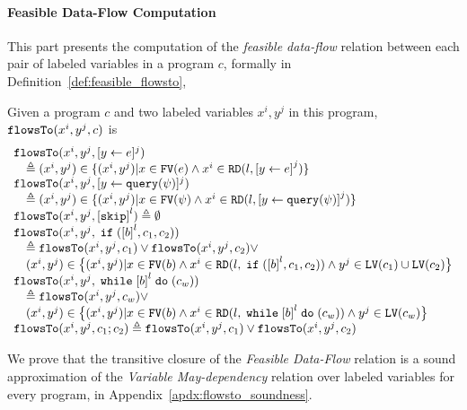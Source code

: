 \paragraph{Feasible Data-Flow Computation}
This part presents the computation of the \emph{feasible data-flow} relation between each pair of labeled variables in a program $c$,
formally in Definition~\ref{def:feasible_flowsto}, 
%
%
\begin{defn}
 \label{def:feasible_flowsto}
 Given a program $c$ and two labeled variables $x^i, y^j$ in this program, 
 $\mathtt{flowsTo}(x^i, y^j, c)$ is 
 \[
 \begin{array}{l}
 \flowsto(x^i, y^j, \clabel{\assign{y}{\expr}}{}^j) 
 \\ \quad \triangleq (x^i, y^j) \in \{ (x^i, y^j) | x \in \kw{FV}(\expr) 
 \land x^i \in \live(l, \clabel{\assign{y}{\expr}}^j) \} \\
 \flowsto(x^i, y^j, \clabel{\assign{y}{\query(\qexpr)}}{}^j) 
 \\ \quad \triangleq (x^i, y^j) \in \{ (x^i, y^j) | x \in \kw{FV}(\qexpr) 
 \land x^i \in \live(l,\clabel{\assign{y}{\query(\qexpr)}}^j) \} \\
 \flowsto(x^i, y^j, \clabel{\eskip}^{l}) 
 \triangleq \emptyset \\
 \flowsto(x^i, y^j, \eif (\clabel{\bexpr}^{l}, c_1, c_2)) 
 \\ \quad \triangleq \flowsto(x^i, y^j, c_1) \lor \flowsto(x^i, y^j, c_2) \lor
 \\ \quad (x^i, y^j) \in \big\{(x^i,y^j) | x \in \kw{FV}(b)  \land
 x^i \in \live(l, \eif (\clabel{\bexpr}^{l}, c_1, c_2)) \land y^j \in \lvar(c_1)\cup \lvar(c_2) \big\}
 \\
 \flowsto(x^i, y^j, \ewhile \clabel{\bexpr}^{l} \edo (c_w)) 
 \\ \quad \triangleq \flowsto(x^i, y^j, c_w) \lor
 \\ \quad
 (x^i, y^j) \in \big\{(x^i,y^j) | x \in \kw{FV}(b) 
 \land x^i \in \live(l, \ewhile \clabel{\bexpr}^{l} \edo (c_w)) \land y^j \in \lvar(c_w) \big\} 
 \\
 \flowsto(x^i, y^j, c_1 ;c_2) 
 \triangleq \flowsto(x^i, y^j, c_1) \lor \flowsto(x^i, y^j, c_2) \\
 \end{array}
 \]
 \end{defn}
%
We prove that the transitive closure of the \emph{Feasible Data-Flow} relation is a sound approximation 
of the \emph{Variable May-dependency} relation over labeled variables for every program,
in Appendix~\ref{apdx:flowsto_soundness}.
%

